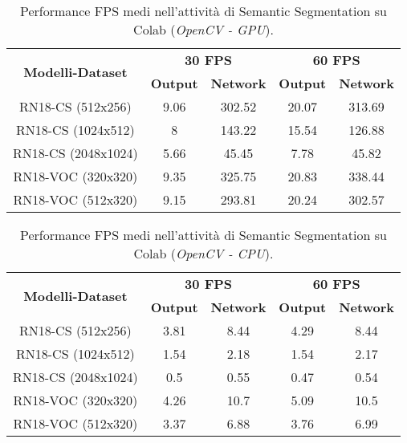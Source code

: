 \begin{table}
    \renewcommand{\baselinestretch}{1}
    \centering
    \begin{adjustbox}{max width=\textwidth}
    \begin{tabular}{|c||c|c||c|c||}
        \hline
        \multirow{2}{*}{\bfseries{\Large Modelli-Dataset}} & \multicolumn{2}{c||}{\bfseries{30 FPS}} & \multicolumn{2}{c||}{\bfseries{60 FPS}}\\            & \bfseries{Output} & \bfseries{Network} & \bfseries{Output} & \bfseries{Network}\\
        \hline
        \hline
        RN18-CS (512x256) & 9.06 & 302.52 & 20.07 & 313.69\\
        \hline
        RN18-CS (1024x512) & 8 & 143.22 & 15.54 & 126.88\\
        \hline 
        RN18-CS (2048x1024) & 5.66 & 45.45 & 7.78 & 45.82\\
        \hline
        RN18-VOC (320x320) & 9.35 & 325.75 & 20.83 & 338.44\\
        \hline
        RN18-VOC (512x320) & 9.15 & 293.81 & 20.24 & 302.57\\
        \hline
    \end{tabular}
    \end{adjustbox}
    \vspace{0.5cm}
    \caption{Performance FPS medi nell'attività di Semantic Segmentation su Colab (\emph{OpenCV - GPU}).}
    \label{average performance Colab GPU sem_seg}
\end{table}

\begin{table}
    \centering
    \begin{adjustbox}{max width=\textwidth}
    \begin{tabular}{|c||c|c||c|c||}
        \hline
        \multirow{2}{*}{\bfseries{\Large Modelli-Dataset}} & \multicolumn{2}{c||}{\bfseries{30 FPS}} & \multicolumn{2}{c||}{\bfseries{60 FPS}}\\            & \bfseries{Output} & \bfseries{Network} & \bfseries{Output} & \bfseries{Network}\\
        \hline
        \hline
        RN18-CS (512x256) & 3.81 & 8.44 & 4.29 & 8.44\\
        \hline
        RN18-CS (1024x512) & 1.54 & 2.18 & 1.54 & 2.17\\
        \hline 
        RN18-CS (2048x1024) & 0.5 & 0.55 & 0.47 & 0.54\\
        \hline
        RN18-VOC (320x320) & 4.26 & 10.7 & 5.09 & 10.5\\
        \hline
        RN18-VOC (512x320) & 3.37 & 6.88 & 3.76 & 6.99\\
        \hline
    \end{tabular}
    \end{adjustbox}
    \vspace{0.5cm}
    \caption{Performance FPS medi nell'attività di Semantic Segmentation su Colab (\emph{OpenCV - CPU}).}
    \label{average performance Colab CPU sem_seg}
\end{table}

